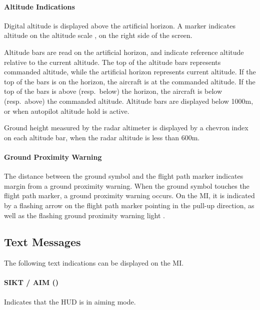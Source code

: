 \paragraph{Altitude Indications}
Digital altitude  is displayed above the artificial horizon.
A marker  indicates altitude
on the altitude scale ,
on the right side of the screen.

Altitude bars  are read on the artificial horizon,
and indicate reference altitude relative to the current altitude.
The top of the altitude bars represents commanded altitude,
while the artificial horizon represents current altitude.
If the top of the bars is on the horizon, the aircraft is at the commanded altitude.
If the top of the bars is above (resp.\ below) the horizon,
the aircraft is below (resp.\ above) the commanded altitude.
Altitude bars are displayed below 1000m, or when autopilot altitude hold is active.

Ground height measured by the radar altimeter is displayed by a chevron index on each altitude bar,
when the radar altitude is less than 600m.

\paragraph{Ground Proximity Warning}
The distance between the ground symbol 
and the flight path marker 
indicates margin from a ground proximity warning.
When the ground symbol touches the flight path marker, a ground proximity warning occurs.
On the MI, it is indicated by a flashing arrow on the flight path marker pointing in the pull-up direction,
as well as the flashing ground proximity warning light .

\subsection{Text Messages}
The following text indications can be displayed on the MI.

\paragraph{SIKT / AIM ()}
Indicates that the HUD is in aiming mode.

